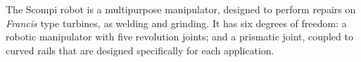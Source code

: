 
The Scompi robot \citep{scompi}%
is a multipurpose manipulator, designed to perform repairs on \textit{Francis}
type turbines, as welding and grinding. It has six degrees of freedom: a robotic
manipulator with five revolution joints; and a prismatic joint, coupled to
curved rails that are designed specifically for each application.



